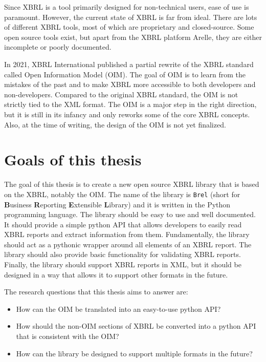 Since XBRL is a tool primarily designed for non-technical users, ease of use is paramount.
However, the current state of XBRL is far from ideal.
There are lots of different XBRL tools, most of which are proprietary and closed-source.
Some open source tools exist, but apart from the XBRL platform Arelle\cite{arelle}, they are either incomplete or poorly documented.

In 2021, XBRL International published a partial rewrite of the XBRL standard called Open Information Model (OIM)\cite{oim}.
The goal of OIM is to learn from the mistakes of the past and to make XBRL more accessible to both developers and non-developers.
Compared to the original XBRL standard, the OIM is not strictly tied to the XML format.
The OIM is a major step in the right direction, but it is still in its infancy and only reworks some of the core XBRL concepts.
Also, at the time of writing, the design of the OIM is not yet finalized.

\section{Goals of this thesis}

The goal of this thesis is to create a new open source XBRL library that is based on the XBRL, notably the OIM.
The name of the library is \texttt{Brel} (short for \textbf{B}usiness \textbf{R}eporting \textbf{E}xtensible \textbf{L}ibrary) and it is written in the Python programming language.
The library should be easy to use and well documented.
It should provide a simple python API that allows developers to easily read XBRL reports and extract information from them.
Fundamentally, the library should act as a pythonic wrapper around all elements of an XBRL report.
The library should also provide basic functionality for validating XBRL reports.
Finally, the library should support XBRL reports in XML, but it should be designed in a way that allows it to support other formats in the future.

The research questions that this thesis aims to answer are:

\begin{itemize}
    \item How can the OIM be translated into an easy-to-use python API?\label{itm:research_question_1}
    \item How should the non-OIM sections of XBRL be converted into a python API that is consistent with the OIM?\label{itm:research_question_2}
    \item How can the library be designed to support multiple formats in the future?\label{itm:research_question_3}
\end{itemize}

